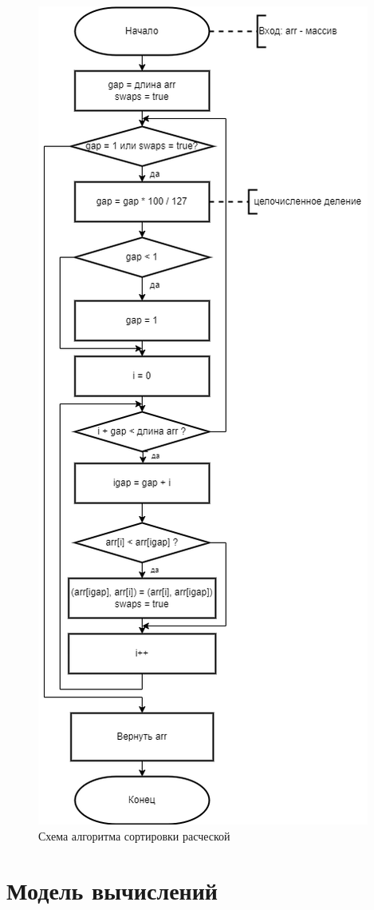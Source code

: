 \begin{figure}[H]
	\centering
	\includegraphics[width=0.7\linewidth, height=0.9\textheight]{inc/img/comb}
	\caption{Схема алгоритма сортировки расческой}
	\label{fig:comb}
\end{figure}

\section{Модель вычислений}

